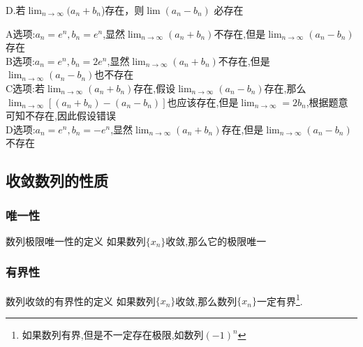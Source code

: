 \documentclass[8pt a4paper, oneside, UTF8]{ctexbook}
\begin{document}
\begin{sloppypar}
\begin{problem}
        D.若$\lim_{n \to \infty}(a_n+b_n$)存在，则$\lim(a_n-b_n)$ 必存在
    \end{problem}
    \begin{solution}
        A选项:$a_n=e^n,b_n=e^n$,显然$\lim_{n \to \infty}(a_n+b_n)$不存在,但是$\lim_{n \to \infty}(a_n-b_n)$存在\\
        B选项:$a_n=e^n,b_n=2e^{n}$,显然$\lim_{n \to \infty}(a_n+b_n)$不存在,但是$\lim_{n \to \infty}(a_n-b_n)$也不存在\\
        C选项:若$\lim_{n \to \infty}(a_n+b_n)$存在,假设$\lim_{ n \to \infty}(a_n-b_n)$存在,那么$\lim_{n\to \infty}[(a_n+b_n)-(a_n-b_n)]$也应该存在,但是$\lim_{n \to \infty}=2 b_n$,根据题意可知不存在,因此假设错误\\
        D选项:$a_n=e^n,b_n=-e^n$,显然$\lim_{n \to \infty}(a_n+b_n)$存在,但是$\lim_{n \to \infty}(a_n-b_n)$不存在
    \end{solution}

    \subsection{收敛数列的性质}
    \subsubsection{唯一性}
    \begin{defn}{数列极限唯一性的定义}{}
        如果数列$\{ x_n \}$收敛,那么它的极限唯一
    \end{defn}
    \subsubsection{有界性}
    \begin{defn}{数列收敛的有界性的定义}{}
        如果数列$\{x_n\}$收敛,那么数列$\{x_n\}$一定有界\footnote{如果数列有界,但是不一定存在极限,如数列$(-1)^n$}.
    \end{defn}

\end{sloppypar}
\end{document}
